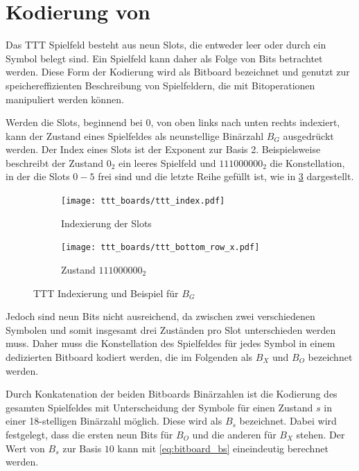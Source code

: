 \section{Kodierung von \ttt}
\label{chap:ttt_encoding}

Das \acl{TTT} Spielfeld besteht aus neun Slots, die entweder leer oder durch ein Symbol belegt sind.  
Ein Spielfeld kann daher als Folge von Bits betrachtet werden. 
Diese Form der Kodierung wird als Bitboard bezeichnet und genutzt zur speichereffizienten Beschreibung von Spielfeldern, die mit Bitoperationen manipuliert werden können. \cite[S. 86]{slateCHESSNorthwesternUniversity1983}

Werden die Slots, beginnend bei $0$, von oben links nach unten rechts indexiert, kann der Zustand eines Spielfeldes als neunstellige Binärzahl $B_G$ ausgedrückt werden. 
Der Index eines Slots ist der Exponent zur Basis 2. 
Beispielsweise beschreibt der Zustand $0_2$ ein leeres Spielfeld und $111000000_2$ die Konstellation, in der die Slots $0-5$ frei sind und die letzte Reihe gefüllt ist, wie in \cref{fig:ttt_index_and_bottomrow} dargestellt.

\begin{figure}
    \centering
    \begin{subfigure}[b]{0.45\textwidth}
      \centering
      \texttt{[image: ttt\_boards/ttt\_index.pdf]}
      \caption{Indexierung der Slots}
      \label{fig:ttt_index}
    \end{subfigure}
    \begin{subfigure}[b]{0.45\textwidth}
      \centering
      \texttt{[image: ttt\_boards/ttt\_bottom\_row\_x.pdf]}
      \caption{Zustand $111000000_2$}
      \label{fig:ttt_bottom_row_x}
    \end{subfigure}
    \caption{\acs{TTT} Indexierung und Beispiel für $B_G$}
    \label{fig:ttt_index_and_bottomrow}
\end{figure}

Jedoch sind neun Bits nicht ausreichend, da zwischen zwei verschiedenen Symbolen und somit insgesamt drei Zuständen pro Slot unterschieden werden muss. 
Daher muss die Konstellation des Spielfeldes für jedes Symbol in einem dedizierten Bitboard kodiert werden, die im Folgenden als $B_X$ und $B_O$ bezeichnet werden.

Durch Konkatenation der beiden Bitboards \bzw Binärzahlen ist die Kodierung des gesamten Spielfeldes mit Unterscheidung der Symbole  für einen Zustand $s$ in einer 18-stelligen Binärzahl möglich. 
Diese wird als $B_{s}$ bezeichnet. 
Dabei wird festgelegt, dass die ersten neun Bits für $B_O$ und die anderen für $B_X$ stehen. Der Wert von $B_s$ zur Basis $10$ kann mit \cref{eq:bitboard_bs} eineindeutig berechnet werden. 


